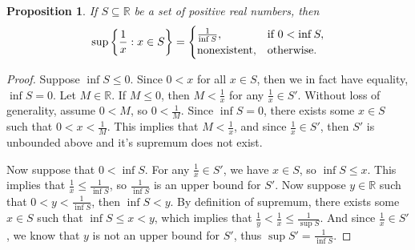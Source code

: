 \documentclass[12pt]{article}
\newtheorem{proposition}{Proposition}
\newcommand{\R}{\mathbb{R}}
\begin{document}
\begin{proposition}
    If $S\subseteq\R$ be a set of positive real numbers, then
    \[ \sup\left\{\frac1x : x\in S\right\} = \begin{cases}
        \frac1{\inf S}, & \textnormal{if } 0<\inf S, \\
        \textnormal{nonexistent},   & \textnormal{otherwise}.
    \end{cases}\]
\end{proposition}

\begin{proof}
    Suppose $\inf S \leq 0$. Since $0<x$ for all $x\in S$, then we in fact have equality, $\inf S= 0$. Let $M\in \R$. If $M\leq 0$, then $M< \frac1x$ for any $\frac1x\in S'$. Without loss of generality, assume $0<M$, so $0<\frac1M$. Since $\inf S = 0$, there exists some $x\in S$ such that $0<x<\frac1M$. This implies that $M < \frac1x$, and since $\frac1x\in S'$, then $S'$ is unbounded above and it's supremum does not exist.
    
    Now suppose that $0<\inf S$. For any $\frac1x\in S'$, we have $x\in S$, so $\inf S \leq x$. This implies that $\frac1x \leq \frac1{\inf S}$, so $\frac1{\inf S}$ is an upper bound for $S'$. Now suppose $y\in \R$ such that $0<y<\frac1{\inf S}$, then $\inf S < y$. By definition of supremum, there exists some $x\in S$ such that $\inf S \leq x < y$, which implies that $\frac1y < \frac1x \leq \frac1{\sup S}$. And since $\frac1x\in S'$, we know that $y$ is not an upper bound for $S'$, thus $\sup S' = \frac1{\inf S}$.
    
\end{proof}
\end{document}
